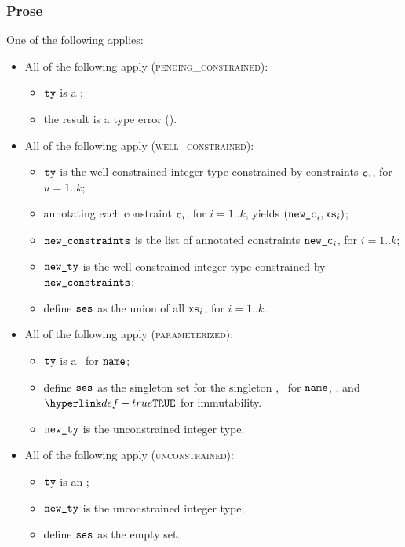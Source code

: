 \subsubsection{Prose}
One of the following applies:
\begin{itemize}
  \item All of the following apply (\textsc{pending\_constrained}):
    \begin{itemize}
      \item $\texttt{ty}$ is a \pendingconstrainedintegertype;
      \item the result is a type error (\UnexpectedPendingConstrained).
    \end{itemize}
  \item All of the following apply (\textsc{well\_constrained}):
    \begin{itemize}
      \item $\texttt{ty}$ is the well-constrained integer type constrained by
        constraints $\texttt{c}_i$, for $u=1..k$;
      \item annotating each constraint $\texttt{c}_i$, for $i=1..k$,
      yields $(\texttt{new\_c}_i, \texttt{xs}_i)$\ProseOrTypeError;
      \item $\texttt{new\_constraints}$ is the list of annotated constraints $\texttt{new\_c}_i$,
      for $i=1..k$;
      \item $\texttt{new\_ty}$ is the well-constrained integer type constrained
        by $\texttt{new\_constraints}$;
      \item define $\texttt{ses}$ as the union of all $\texttt{xs}_i$, for $i=1..k$.
    \end{itemize}

    \item All of the following apply (\textsc{parameterized}):
    \begin{itemize}
      \item $\texttt{ty}$ is a \parameterizedintegertype\ for $\texttt{name}$;
      \item define $\texttt{ses}$ as the singleton set for the singleton \sideeffectdescriptorterm,
            \ReadLocalTerm\ for $\texttt{name}$, \timeframeconstant, and $\True$ for immutability.
      \item $\texttt{new\_ty}$ is the unconstrained integer type.
    \end{itemize}

    \item All of the following apply (\textsc{unconstrained}):
    \begin{itemize}
      \item $\texttt{ty}$ is an \unconstrainedintegertype;
      \item $\texttt{new\_ty}$ is the unconstrained integer type;
      \item define $\texttt{ses}$ as the empty set.
    \end{itemize}
  \end{itemize}

